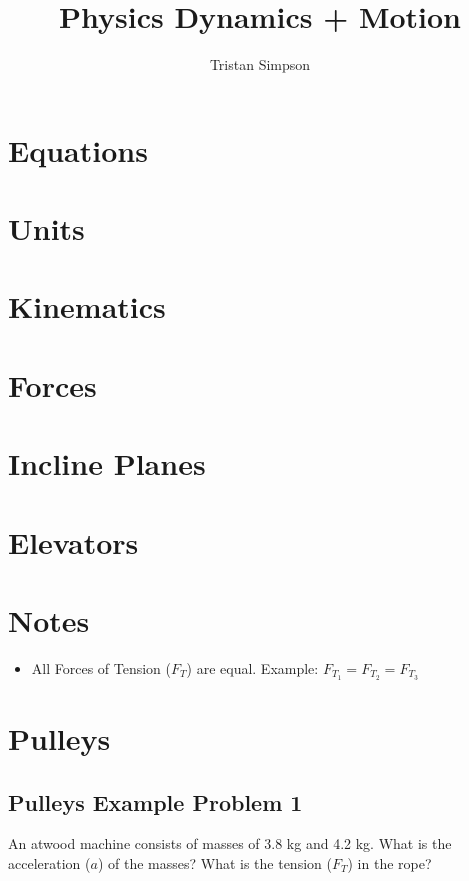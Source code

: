 \documentclass{article}
\title{Physics Dynamics + Motion}
\author{Tristan Simpson}
\begin{document}
\maketitle
\tableofcontents

\section{Equations}

\section{Units}

\section{Kinematics}

\section{Forces}

\section{Incline Planes}

\section{Elevators}

\section{Notes}
\begin{itemize}
    \item All Forces of Tension ($F_T$) are equal. Example: $F_{T_1} = F_{T_2} = F_{T_3}$
\end{itemize}

\section{Pulleys}
\subsection{Pulleys Example Problem 1}
An atwood machine consists of masses of 3.8 kg and 4.2 kg. What is the acceleration ($a$) of the masses? What is the tension ($F_T$) in the rope?
\end{document}

